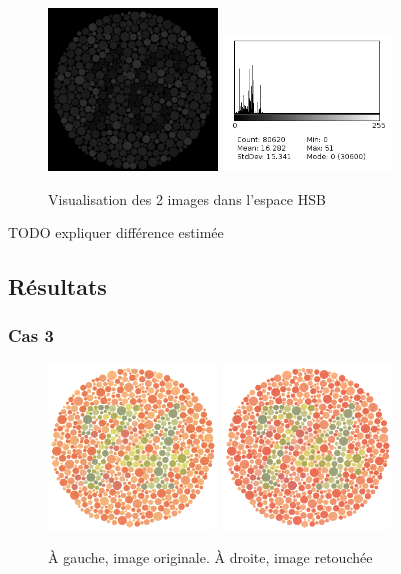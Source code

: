 \documentclass[a4paper]{article}
\begin{document}
\begin{figure}[H]
\begin{center}
\includegraphics[width=170px]{../resultats/e2_q3_1_diff.png}
\includegraphics[width=170px]{../resultats/e2_q3_1_diff_hist.png}
\end{center}
\caption{Visualisation des 2 images dans l'espace HSB}
\end{figure}

TODO expliquer différence estimée

\clearpage
\subsection{Résultats}
\subsubsection{Cas 3}

\begin{figure}[H]
\begin{center}
\includegraphics[width=170px]{../base/cas_3_dalton74.png}
\includegraphics[width=170px]{../resultats/e3_q1_modif.png}
\end{center}
\caption{À gauche, image originale. À droite, image retouchée}
\end{figure}
\end{document}
